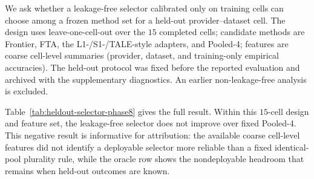 We ask whether a leakage-free selector calibrated only on training cells can choose among a frozen
method set for a held-out provider--dataset cell. The design uses leave-one-cell-out over the $15$
completed cells; candidate methods are Frontier, FTA, the L1-/S1-/TALE-style adapters, and Pooled-4;
features are coarse cell-level summaries (provider, dataset, and training-only empirical
accuracies). The held-out protocol was fixed before the reported evaluation and archived with the
supplementary diagnostics. An earlier non-leakage-free analysis is excluded.

\begin{table}[tbp]
\centering
\footnotesize
\setlength{\tabcolsep}{4pt}
\caption{Leave-one-cell-out selector over $15$ completed cells with coarse cell-level features.
The selector chooses Pooled-4 in every fold and ties fixed Pooled-4; the oracle row is
non-deployable headroom.}
\label{tab:heldout-selector-phase8}

\end{table}

Table~\ref{tab:heldout-selector-phase8} gives the full result. Within this $15$-cell design and
feature set, the leakage-free selector does not improve over fixed Pooled-4. This negative result
is informative for attribution: the available coarse cell-level features did not identify a
deployable selector more reliable than a fixed identical-pool plurality rule, while the oracle row
shows the nondeployable headroom that remains when held-out outcomes are known.
